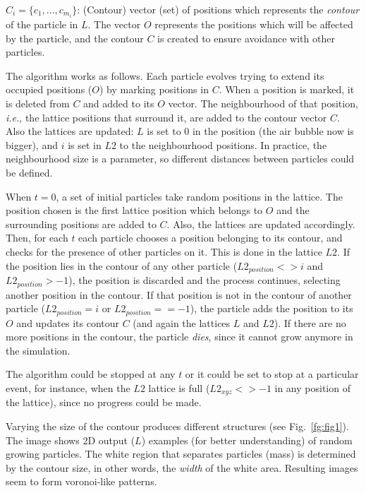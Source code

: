 \documentclass[oneside,a4paper,english,links]{amca}
\begin{document}
$C_{i} = \{c_{1}, ... , c_{m_{i}}\}$: (Contour) vector (set) of positions which represents the {\em contour} of the particle in $L$. The vector $O$ represents the positions which will be affected by the particle, and the contour $C$ is created to ensure avoidance with other particles.

The algorithm works as follows. Each particle evolves trying to extend its occupied positions ($O$) by marking positions in $C$. When a position is marked, it is deleted from $C$ and added to its $O$ vector. The neighbourhood of that position, {\em i.e.}, the lattice positions that surround it, are added to the contour vector $C$. Also the lattices are updated: $L$ is set to $0$ in the position (the air bubble now is bigger), and $i$ is set in $L2$ to the neighbourhood positions. In practice, the neighbourhood size is a parameter, so different distances between particles could be defined.

When $t = 0$, a set of initial particles take random positions in the lattice. The position chosen is the first lattice position which belongs to $O$ and the surrounding positions are added to $C$. Also, the lattices are updated accordingly. Then, for each $t$ each particle chooses a position belonging to its contour, and checks for the presence of other particles on it. This is done in the lattice $L2$. If the position lies in the contour of any other particle ($L2_{position} <> i$ and $L2_{position} > -1$), the position is discarded and the process continues, selecting another position in the contour. If that position is not in the contour of another particle ($L2_{position} = i$ or $L2_{position} == -1$), the particle adds the position to its $O$ and updates its contour $C$ (and again the lattices $L$ and $L2$). If there are no more positions in the contour, the particle {\em dies}, since it cannot grow anymore in the simulation.

The algorithm could be stopped at any $t$ or it could be set to stop at a particular event, for instance, when the $L2$ lattice is full ($L2_{xyz} <> -1$ in any position of the lattice), since no progress could be made.

Varying the size of the contour produces different structures (see Fig.~\ref{fg:fig1}). The image shows 2D output ($L$) examples (for better understanding) of random growing particles. The white region that separates particles (mass) is determined by the contour size, in other words, the {\em width} of the white area. Resulting images seem to form voronoi-like patterns.
\end{document}
